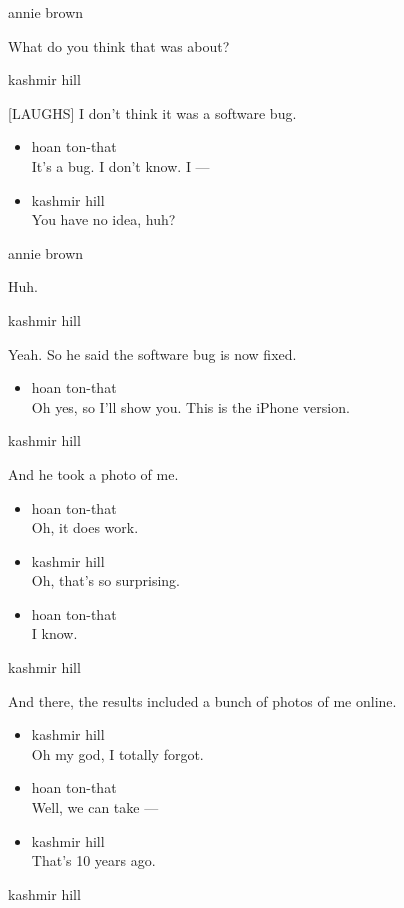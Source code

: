 annie brown

What do you think that was about?

kashmir hill

{[}LAUGHS{]} I don't think it was a software bug.

\begin{itemize}
\item
  hoan ton-that\\
  It's a bug. I don't know. I ---
\item
  kashmir hill\\
  You have no idea, huh?
\end{itemize}

annie brown

Huh.

kashmir hill

Yeah. So he said the software bug is now fixed.

\begin{itemize}
\tightlist
\item
  hoan ton-that\\
  Oh yes, so I'll show you. This is the iPhone version.
\end{itemize}

kashmir hill

And he took a photo of me.

\begin{itemize}
\item
  hoan ton-that\\
  Oh, it does work.
\item
  kashmir hill\\
  Oh, that's so surprising.
\item
  hoan ton-that\\
  I know.
\end{itemize}

kashmir hill

And there, the results included a bunch of photos of me online.

\begin{itemize}
\item
  kashmir hill\\
  Oh my god, I totally forgot.
\item
  hoan ton-that\\
  Well, we can take ---
\item
  kashmir hill\\
  That's 10 years ago.
\end{itemize}

kashmir hill

